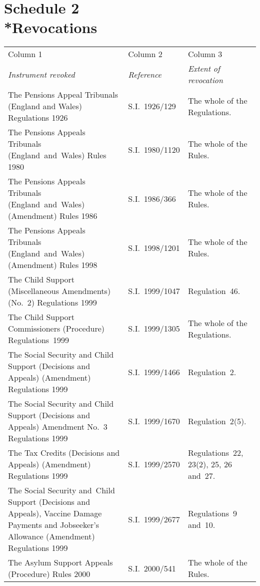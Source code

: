 \documentclass[12pt,a4paper]{article}
\begin{document}
\part[Schedule 2 --- Revocations]{Schedule 2\\*Revocations}

\renewcommand\parthead{--- Schedule 2}

{\noindent\footnotesize
\begin{longtable}{p{154.60547pt}lp{131.7065pt}}
\hline
Column 1&
Column 2&
Column 3\\
\itshape 
Instrument revoked
	&
\itshape 
Reference
	&
\itshape 
Extent of revocation\\
\hline
\endhead
\hline
\endlastfoot
\hbadness=2401 The Pensions Appeal Tribunals (England and Wales) Regulations 1926	&S.I.~1926/129	&The whole of the Regulations.\\
The Pensions Appeals Tribunals (England~and~Wales) Rules 1980	&S.I.~1980/1120	&The whole of the Rules.\\
The Pensions Appeals Tribunals (England~and~Wales) (Amendment) Rules 1986	&S.I.~1986/366	&The whole of the Rules.\\
The Pensions Appeals Tribunals (England~and~Wales) (Amendment) Rules 1998	&S.I.~1998/1201	&The whole of the Rules.\\
The Child Support (Miscellaneous Amendments) (No.~2) Regulations 1999	&S.I.~1999/1047	&Regulation~46.\\
The Child Support Commissioners (Procedure) Regulations~1999	&S.I.~1999/1305	&The whole of the Regulations.\\
\hbadness=2772 The Social Security and Child Support (Decisions and Appeals) (Amendment) Regulations 1999	&S.I.~1999/1466	&Regulation~2.\\
\hbadness=2772 The Social Security and Child Support (Decisions and Appeals) Amendment No.~3 Regulations 1999	&S.I.~1999/1670	&Regulation~2(5).\\
The Tax Credits (Decisions and Appeals) (Amendment) Regulations 1999	&S.I.~1999/2570	&Regulations~22, 23(2), 25, 26 and~27.\\
\hbadness=3178 The Social Security and~Child Support (Decisions and Appeals), Vaccine Damage Payments and Jobseeker’s Allowance (Amendment) Regulations 1999	&S.I.~1999/2677	&Regulations~9 and~10.\\
The Asylum Support Appeals (Procedure) Rules 2000	&S.I.~2000/541	&The whole of the Rules.\\

\end{longtable}}
\end{document}

